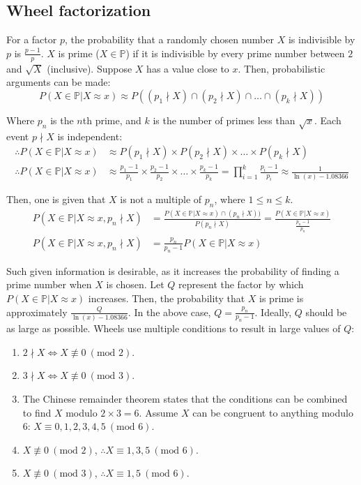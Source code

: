 \documentclass{article}
\begin{document}
\subsection{Wheel factorization}

For a factor \(p\), the probability that a randomly chosen number \(X\) is indivisible by \(p\) is \(\frac{p-1}{p}\). \(X\) is prime (\(X \in \mathbb{P}\)) if it is indivisible by every prime number between \(2\) and \(\sqrt{X}\) (inclusive). Suppose \(X\) has a value close to \(x\). Then, probabilistic arguments can be made:
	\[P(X \in \mathbb{P}|X \approx x) \approx P((p_1 \nmid X)\cap(p_2 \nmid X)\cap\ldots\cap(p_k \nmid X))\]

Where \(p_n\) is the \(n\)th prime, and \(k\) is the number of primes less than \(\sqrt{x}\). Each event \(p \nmid X\) is independent:
\begin{align}
	\nonumber \therefore P(X \in \mathbb{P}|X \approx x) &\approx P(p_1 \nmid X)\times P(p_2 \nmid X)\times\ldots\times P(p_k \nmid X) \\
	\nonumber \therefore P(X \in \mathbb{P}|X \approx x) &\approx \frac{p_1-1}{p_1}\times \frac{p_2-1}{p_2}\times\ldots\times \frac{p_k-1}{p_k}=\prod_{i=1}^{k}\frac{p_i-1}{p_i} \approx \frac{1}{\ln(x) - 1.08366}
\end{align}

Then, one is given that \(X\) is not a multiple of \(p_n\), where \(1 \leq n \leq k\).
\begin{align}
	\nonumber P(X \in \mathbb{P}|X \approx x,p_n \nmid X) &= \frac{P(X \in \mathbb{P}|X \approx x)\cap (p_n \nmid X))}{P(p_n \nmid X)} = \frac{P(X \in \mathbb{P}|X \approx x)}{\frac{p_n-1}{p_n}} \\
	\nonumber P(X \in \mathbb{P}|X \approx x,p_n \nmid X) &= \frac{p_n}{p_n-1}P(X \in \mathbb{P}|X \approx x)
\end{align}

Such given information is desirable, as it increases the probability of finding a prime number when \(X\) is chosen. Let \(Q\) represent the factor by which \(P(X \in \mathbb{P}|X \approx x)\) increases. Then, the probability that \(X\) is prime is approximately \(\frac{Q}{\ln(x) - 1.08366}\). In the above case, \(Q=\frac{p_n}{p_n-1}\). Ideally, \(Q\) should be as large as possible. Wheels use multiple conditions to result in large values of \(Q\):

\begin{enumerate}
	\item \(2 \nmid X \iff X \not\equiv 0\ (\text{mod }2)\).
	\item \(3 \nmid X \iff X \not\equiv 0\ (\text{mod }3)\).
	\item The Chinese remainder theorem states that the conditions can be combined to find \(X\) modulo \(2 \times 3 = 6\). Assume \(X\) can be congruent to anything modulo 6: \(X \equiv 0,1,2,3,4,5\ (\text{mod }6)\).
	\item \(X \not\equiv 0\ (\text{mod }2)\), \(\therefore X \equiv 1,3,5\ (\text{mod }6)\).
	\item \(X \not\equiv 0\ (\text{mod }3)\), \(\therefore X \equiv 1,5\ (\text{mod }6)\).
\end{enumerate}
	
\end{document}
